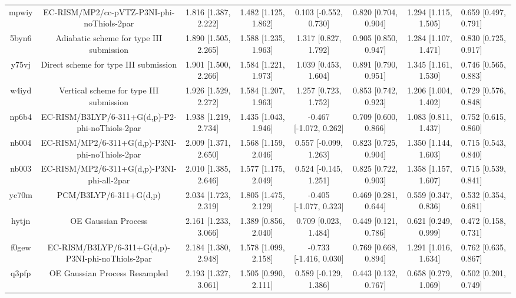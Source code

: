\documentclass{article}
\begin{document}
\begin{center}
\begin{longtable}{|ccccccc|}
 mpwiy &         EC-RISM/MP2/cc-pVTZ-P3NI-phi-noThiols-2par &  1.816 [1.387, 2.222] &  1.482 [1.125, 1.862] &    0.103 [-0.552, 0.730] &  0.820 [0.704, 0.904] &   1.294 [1.115, 1.505] &   0.659 [0.497, 0.791] \\
 5byn6 &           Adiabatic scheme for type III submission &  1.890 [1.505, 2.265] &  1.588 [1.235, 1.963] &     1.317 [0.827, 1.792] &  0.905 [0.850, 0.947] &   1.284 [1.107, 1.471] &   0.830 [0.725, 0.917] \\
 y75vj &              Direct scheme for type III submission &  1.901 [1.500, 2.266] &  1.584 [1.221, 1.973] &     1.039 [0.453, 1.604] &  0.891 [0.790, 0.951] &   1.345 [1.161, 1.530] &   0.746 [0.565, 0.883] \\
 w4iyd &            Vertical scheme for type III submission &  1.926 [1.529, 2.272] &  1.584 [1.207, 1.963] &     1.257 [0.723, 1.752] &  0.853 [0.742, 0.923] &   1.206 [1.004, 1.402] &   0.729 [0.576, 0.848] \\
 np6b4 &    EC-RISM/B3LYP/6-311+G(d,p)-P2-phi-noThiols-2par &  1.938 [1.219, 2.734] &  1.435 [1.043, 1.946] &   -0.467 [-1.072, 0.262] &  0.709 [0.600, 0.866] &   1.083 [0.811, 1.437] &   0.752 [0.615, 0.860] \\
 nb004 &    EC-RISM/MP2/6-311+G(d,p)-P3NI-phi-noThiols-2par &  2.009 [1.371, 2.650] &  1.568 [1.159, 2.046] &    0.557 [-0.099, 1.263] &  0.823 [0.725, 0.904] &   1.350 [1.144, 1.603] &   0.715 [0.543, 0.840] \\
 nb003 &         EC-RISM/MP2/6-311+G(d,p)-P3NI-phi-all-2par &  2.010 [1.385, 2.646] &  1.577 [1.175, 2.049] &    0.524 [-0.145, 1.251] &  0.825 [0.722, 0.903] &   1.358 [1.157, 1.607] &   0.715 [0.539, 0.841] \\
 yc70m &                             PCM/B3LYP/6-311+G(d,p) &  2.034 [1.723, 2.319] &  1.805 [1.475, 2.129] &   -0.405 [-1.077, 0.323] &  0.469 [0.281, 0.644] &   0.559 [0.347, 0.836] &   0.532 [0.354, 0.681] \\
 hytjn &                                OE Gaussian Process &  2.161 [1.233, 3.066] &  1.389 [0.856, 2.040] &     0.709 [0.023, 1.484] &  0.449 [0.121, 0.786] &   0.621 [0.249, 0.999] &   0.472 [0.158, 0.731] \\
 f0gew &  EC-RISM/B3LYP/6-311+G(d,p)-P3NI-phi-noThiols-2par &  2.184 [1.380, 2.948] &  1.578 [1.099, 2.158] &   -0.733 [-1.416, 0.030] &  0.769 [0.668, 0.894] &   1.291 [1.016, 1.634] &   0.762 [0.635, 0.867] \\
 q3pfp &                      OE Gaussian Process Resampled &  2.193 [1.327, 3.061] &  1.505 [0.990, 2.111] &    0.589 [-0.129, 1.386] &  0.443 [0.132, 0.767] &   0.658 [0.279, 1.069] &   0.502 [0.201, 0.749] \\

\end{longtable}
\end{center}
\end{document}
